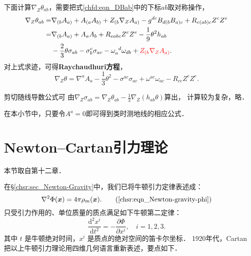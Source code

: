 下面计算$\nabla_Z \theta_{ab}$，需要把式\eqref{chfd:eqn_DBab}中的下标$ab$取对称操作，
\begin{equation}\label{chfd:eqn_Dtheta}
\begin{aligned}
    \nabla_Z \theta_{ab} = & %
     \nabla_{(b} A_{a)} + A_{(a} A_{b)} + Z_{(b}\nabla_Z A_{a)}
    -g^{dc} B_{d(b} B_{a)c} + R_{e(ab)c}Z^c Z^e  \\
    =& \nabla_{(b} A_{a)} + A_{a} A_{b}  + R_{eabc}Z^c Z^e
     -\frac{1}{9}\theta^2 h_{ab}  \\
     &- \frac{2}{3}\theta\sigma_{ab}
      - \sigma_{b}^c\sigma_{ac} - \omega_{a}^{\hphantom{a} d}\omega_{db}
      + {\color{red}Z_{(b}\nabla_Z A_{a)}} .
\end{aligned}
\end{equation} %
对上式求迹，可得{\bfseries \heiti Raychaudhuri方程}，
\begin{equation}\label{chfd:eqn_Raychaudhuri}
    \nabla_Z\theta= \nabla^{a} A_{a}
    - \frac{1}{3}\theta^2 - \sigma^{ac}\sigma_{ac}
    + \omega^{ac}\omega_{ac} - R_{ce}Z^c Z^e .
\end{equation}

剪切随线导数公式可
由$\nabla_Z \sigma_{ab}= \nabla_Z \theta_{ab} - \frac{1}{3} \nabla_Z(h_{ab}\theta)$算出，
计算较为复杂，略．

在本小节中，只要令$A^a=0$即可得到类时测地线的相应公式．






\section{Newton--Cartan引力理论}

本节取自\textcite{mtw1973}第十二章．

在\S\ref{chsr:sec_Newton-Gravity}中，我们已将牛顿引力定律表述成：
\begin{equation}
	\nabla ^2 \Phi(\boldsymbol{x}) = 4 \pi \rho_m(\boldsymbol{x}) . \tag{\ref{chsr:eqn_Newton-gravity-phi}}
\end{equation}
只受引力作用的、单位质量的质点满足如下牛顿第二定律：
\begin{equation}\label{chfd:eqn_NC-n2}
	\frac{\mathrm{d}^2 x^i}{\mathrm{d} t^2}=-\frac{\partial \Phi}{\partial x^i}, \quad i=1,2,3 .
\end{equation}
其中 $t$ 是牛顿绝对时间，$x^i$ 是质点的绝对空间的笛卡尔坐标．
1920年代，Cartan把以上牛顿引力理论用四维几何语言重新表述，要点如下．

